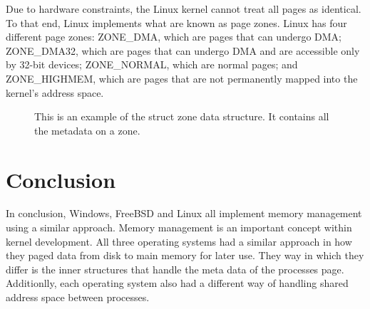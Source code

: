 \documentclass[journal,letterpaper,draftclsnofoot,onecolumn,10pt]{IEEEtran}
\begin{document}
Due to hardware constraints, the Linux kernel cannot treat all pages as identical. To that end, Linux implements what are known as page zones. Linux has four different page zones: ZONE\_DMA, which are pages that can undergo DMA; ZONE\_DMA32, which are pages that can undergo DMA and are accessible only by 32-bit devices; ZONE\_NORMAL, which are normal pages; and ZONE\_HIGHMEM, which are pages that are not permanently mapped into the kernel's address space. \cite{l05}

\begin{figure}[H]
   
   \caption{This is an example of the struct zone data structure. It contains all the metadata on a zone.}
\end{figure}

\section{Conclusion}
In conclusion, Windows, FreeBSD and Linux all implement memory management using a similar approach. Memory management is an important concept within kernel development. All three operating systems had a similar approach in how they paged data from disk to main memory for later use. They way in which they differ is the inner structures that handle the meta data of the processes page. Additionlly, each operating system also had a different way of handling shared address space between processes.

\vfill

\pagebreak




\end{document}
